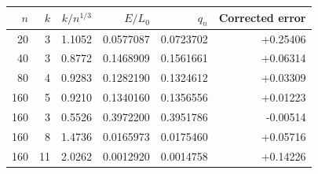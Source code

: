 \begin{tabular}{rrrrrr}
\toprule
$n$&$k$&$k/n^{1/3}$&$E/L_0$&$q_n$&Corrected error\\
\midrule
20 & 3 & 1.1052 & 0.0577087 & 0.0723702 & +0.25406 \\
40 & 3 & 0.8772 & 0.1468909 & 0.1561661 & +0.06314 \\
80 & 4 & 0.9283 & 0.1282190 & 0.1324612 & +0.03309 \\
160 & 5 & 0.9210 & 0.1340160 & 0.1356556 & +0.01223 \\
160 & 3 & 0.5526 & 0.3972200 & 0.3951786 & -0.00514 \\
160 & 8 & 1.4736 & 0.0165973 & 0.0175460 & +0.05716 \\
160 & 11 & 2.0262 & 0.0012920 & 0.0014758 & +0.14226 \\
\bottomrule
\end{tabular}
